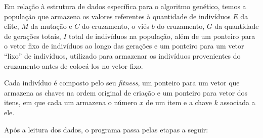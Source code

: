 Em relação à estrutura de dados específica para o algoritmo genético, temos a população que armazena os valores referentes à quantidade de indivíduos $E$ da elite, $M$ da mutação e $C$ do cruzamento, o viés $b$ do cruzamento, $G$ da quantidade de gerações totais, $I$ total de indivíduos na população, além de um ponteiro para o vetor fixo de indivíduos ao longo das gerações e um ponteiro para um vetor ``lixo'' de indivíduos, utilizado para armazenar os indivíduos provenientes do cruzamento antes de colocá-los no vetor fixo.

Cada indivíduo é composto pelo seu \textit{fitness}, um ponteiro para um vetor que armazena as chaves na ordem original de criação e um ponteiro para vetor dos itens, em que cada um armazena o número $x$ de um item e a chave $k$ associada a ele.

Após a leitura dos dados, o programa passa pelas etapas a seguir:

